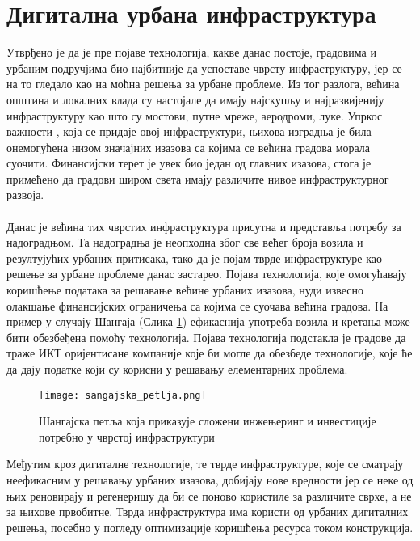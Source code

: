 \documentclass{article}
\begin{document}
\section{Дигитална урбана инфраструктура}
Утврђено је да је пре појаве технологија, какве данас постоје, градовима и урбаним подручјима био најбитније да успоставе чврсту инфраструктуру, јер се на то гледало као на моћна решења за урбане проблеме. Из тог разлога, већина општина и локалних влада су настојале да имају најскупљу и најразвијенију инфраструктуру као што су мостови, путне мреже, аеродроми, луке. Упркос важности , која се придаје овој инфраструктури, њихова изградња је била онемогућена низом значајних изазова са којима се већина градова морала суочити. Финансијски терет је увек био један од главних изазова, стога је примећено да градови широм света имају различите нивое инфраструктурног развоја. 
\\\\
Данас је већина тих чврстих инфраструктура присутна и представља потребу за надоградњом. Та надоградња је неопходна због све већег броја возила и резултујућих урбаних притисака, тако да је појам тврде инфраструктуре као решење за урбане проблеме данас застарео. Појава технологија, које омогућавају коришћење података за решавање већине урбаних изазова, нуди извесно олакшање финансијских ограничења са којима се суочава већина градова. На пример у случају Шангаја (Слика \ref{fig:sangaj}) ефикаснија употреба возила и кретања може бити обезбеђена помоћу технологија. Појава технологија подстакла је градове да траже ИКТ оријентисане компаније које би могле да обезбеде технологије, које ће да дају податке који су корисни у решавању елементарних проблема. \\
\begin{figure}[h!]
\centering
\texttt{[image: sangajska\_petlja.png]}
\caption{\label{fig:sangaj}Шангајска петља која приказује сложени инжењеринг и инвестиције
потребно у чврстој инфраструктури}
\end{figure} 

Међутим кроз дигиталне технологије, те тврде инфраструктуре, које се сматрају неефикасним у решавању урбаних изазова, добијају нове вредности јер се неке од њих реновирају и регенеришу да би се поново користиле за различите сврхе, а не за њихове првобитне. Тврда инфраструктура има користи од урбаних дигиталних решења, посебно у погледу оптимизације коришћења ресурса током конструкција. \\
\end{document}
